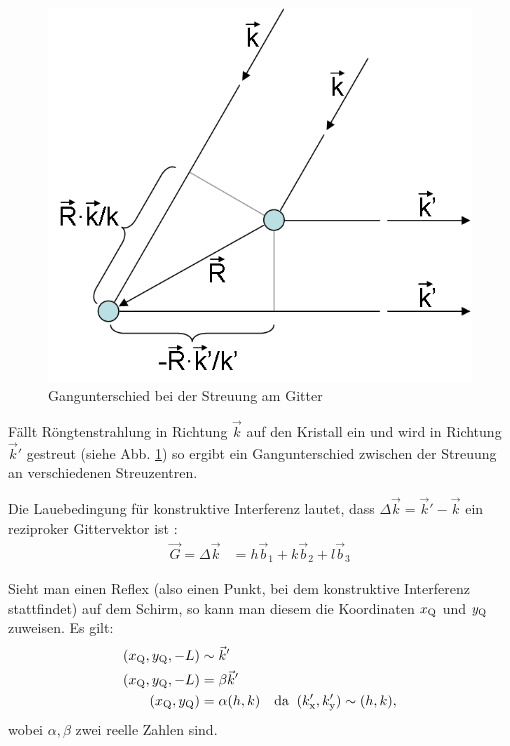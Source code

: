 \begin{figure}
\centering
\includegraphics[scale=0.75]{data/laue/Laue-Bedingung.png}
\caption{Gangunterschied bei der Streuung am Gitter\cite{wiki_laue_bed}}
\label{fig:laue_bed}
\end{figure}

Fällt Röngtenstrahlung in Richtung $\vec{k}$ auf den Kristall ein und wird in Richtung $\vec{k}'$ gestreut (siehe Abb. \ref{fig:laue_bed}) so ergibt ein Gangunterschied zwischen der Streuung an verschiedenen Streuzentren. 

Die Lauebedingung für konstruktive Interferenz lautet, dass $\Delta \vec{k} = \vec{k}'-\vec{k}$ ein reziproker Gittervektor ist \cite{wiki_laue_bed}:
\begin{align*}
\vec{G} = \Delta \vec{k} &= h\vec{b}_1 + k\vec{b}_2 + l\vec{b}_3
\end{align*}

Sieht man einen Reflex (also einen Punkt, bei dem konstruktive Interferenz stattfindet) auf dem Schirm, so kann man diesem die Koordinaten $x_\mathrm{Q}$ und $y_\mathrm{Q}$ zuweisen. Es gilt:
\begin{align*}
(x_\mathrm{Q}, y_\mathrm{Q},-L) &\sim \vec{k}'\\
(x_\mathrm{Q}, y_\mathrm{Q},-L) &= \beta \vec{k}'\\
(x_\mathrm{Q}, y_\mathrm{Q}) &= \alpha (h,k) & \text{da}\;\;(k_\mathrm{x}',k_\mathrm{y}') \sim (h,k),
\end{align*}
wobei $\alpha, \beta$ zwei reelle Zahlen sind.

